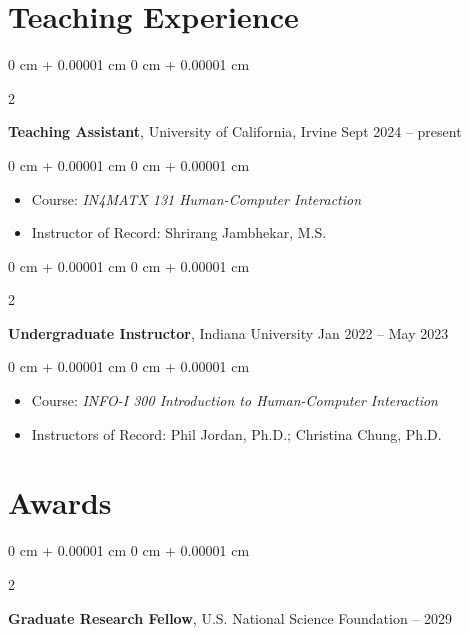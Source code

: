 \documentclass[10pt, letterpaper]{article}
\newenvironment{highlights}{
    \begin{itemize}[
        topsep=0.10 cm,
        parsep=0.10 cm,
        partopsep=0pt,
        itemsep=0pt,
        leftmargin=0 cm + 10pt
    ]
}{
    \end{itemize}
} %
\newenvironment{onecolentry}{
    \begin{adjustwidth}{
        0 cm + 0.00001 cm
    }{
        0 cm + 0.00001 cm
    }
}{
    \end{adjustwidth}
} %
\newenvironment{twocolentry}[2][]{
    \onecolentry
    \def\secondColumn{#2}
    \setcolumnwidth{\fill, 4.0 cm}
    \begin{paracol}{2}
}{
    \switchcolumn \raggedleft \secondColumn
    \end{paracol}
    \endonecolentry
} %
\begin{document}
    
    \section{Teaching Experience}



        
        \begin{twocolentry}{
            Sept 2024 – present
        }
            \textbf{Teaching Assistant}, University of California, Irvine\end{twocolentry}

        \vspace{0.10 cm}
        \begin{onecolentry}
            \begin{highlights}
                \item Course: \textit{IN4MATX 131 Human-Computer Interaction}
                \item Instructor of Record: Shrirang Jambhekar, M.S.
            \end{highlights}
        \end{onecolentry}


        \vspace{0.21 cm}

        \begin{twocolentry}{
            Jan 2022 – May 2023
        }
            \textbf{Undergraduate Instructor}, Indiana University\end{twocolentry}

        \vspace{0.10 cm}
        \begin{onecolentry}
            \begin{highlights}
                \item Course: \textit{INFO-I 300 Introduction to Human-Computer Interaction}
                \item Instructors of Record: Phil Jordan, Ph.D.; Christina Chung, Ph.D.
            \end{highlights}
        \end{onecolentry}



    
    \section{Awards}



        
        \begin{twocolentry}{
            2024 – 2029
        }
            \textbf{Graduate Research Fellow}, U.S. National Science Foundation\end{twocolentry}
\end{document}
